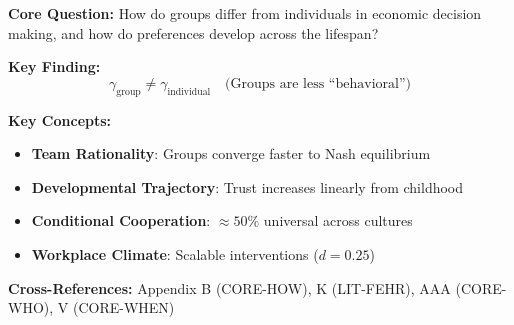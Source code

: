 \begin{tcolorbox}[colback=blue!5!white, colframe=blue!75!black,
    title=Quick Reference: Matthias Sutter's Contributions]

\textbf{Core Question:} How do groups differ from individuals in economic decision making, and how do preferences develop across the lifespan?

\textbf{Key Finding:}
\begin{equation}
\gamma_{\text{group}} \neq \gamma_{\text{individual}} \quad \text{(Groups are less ``behavioral'')}
\end{equation}

\textbf{Key Concepts:}
\begin{itemize}[nosep]
\item \textbf{Team Rationality}: Groups converge faster to Nash equilibrium
\item \textbf{Developmental Trajectory}: Trust increases linearly from childhood
\item \textbf{Conditional Cooperation}: $\approx 50\%$ universal across cultures
\item \textbf{Workplace Climate}: Scalable interventions ($d = 0.25$)
\end{itemize}

\textbf{Cross-References:} Appendix B (CORE-HOW), K (LIT-FEHR), AAA (CORE-WHO), V (CORE-WHEN)
\end{tcolorbox}


